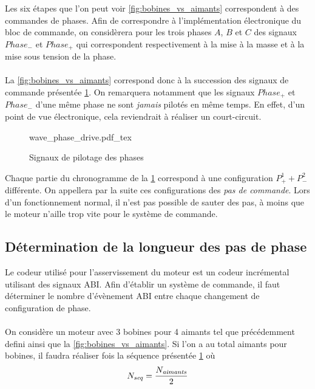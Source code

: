 Les six étapes que l'on peut voir \cref{fig:bobines_vs_aimants} correspondent à des commandes de phases.
Afin de correspondre à l'implémentation électronique du bloc de commande, on considèrera pour les trois phases $A$, $B$ et $C$ des signaux $\mathit{Phase}_-$ et $\mathit{Phase}_+$
qui correspondent respectivement à la mise à la masse et à la mise sous tension de la phase.

\paragraph{}
La \cref{fig:bobines_vs_aimants} correspond donc à la succession des signaux de commande présentée \cref{fig:wave_phase_drive}. 
On remarquera notamment que les signaux $\mathit{Phase}_+$ et $\mathit{Phase}_-$ d'une même phase ne sont \emph{jamais} pilotés en même temps.
En effet, d'un point de vue électronique, cela reviendrait à réaliser un court-circuit. 

\begin{figure}[h]
    \centering
    {wave_phase_drive.pdf_tex}
    \caption{Signaux de pilotage des phases}
    \label{fig:wave_phase_drive}
\end{figure}

Chaque partie du chronogramme de la \cref{fig:wave_phase_drive} correspond à une configuration $P^1_+ + P^2_-$ différente.
On appellera par la suite ces configurations des \emph{pas de commande}.
Lors d'un fonctionnement normal, il n'est pas possible de sauter des pas, à moins que le moteur n'aille trop vite pour le système de commande.  

\subsection{Détermination de la longueur des pas de phase}
Le codeur utilisé pour l'asservissement du moteur est un codeur incrémental utilisant des signaux ABI.
Afin d'établir un système de commande, il faut déterminer \dnabi le nombre d'évènement ABI entre chaque changement de configuration de phase.

\paragraph{}
On considère un moteur avec 3 bobines pour 4 aimants tel que précédemment defini ainsi que la \cref{fig:bobines_vs_aimants}.
Si l'on a au total \naimants aimants pour \nbobines bobines, il faudra réaliser \nseq fois la séquence présentée \cref{fig:wave_phase_drive} où
$$N_\mathit{seq} = \frac{N_\mathit{aimants}}{2}$$

